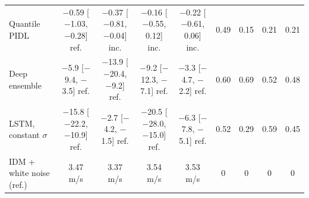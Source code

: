 \begin{table}[t]
\begin{tabularx}{\textwidth}{lCCCCcccc}
Quantile PIDL & $-$0.59 [$-$1.03, $-$0.28] ref. & $-$0.37 [$-$0.81, $-$0.04] inc. & $-$0.16 [$-$0.55, 0.12] inc. & $-$0.22 [$-$0.61, 0.06] inc. & 0.49 & 0.15 & 0.21 & 0.21 \\
Deep ensemble & $-$5.9 [$-$9.4, $-$3.5] ref. & $-$13.9 [$-$20.4, $-$9.2] ref. & $-$9.2 [$-$12.3, $-$7.1] ref. & $-$3.3 [$-$4.7, $-$2.2] ref. & 0.60 & 0.69 & 0.52 & 0.48 \\
LSTM, constant $\sigma$ & $-$15.8 [$-$22.2, $-$10.9] ref. & $-$2.7 [$-$4.2, $-$1.5] ref. & $-$20.5 [$-$28.0, $-$15.0] ref. & $-$6.3 [$-$7.8, $-$5.1] ref. & 0.52 & 0.29 & 0.59 & 0.45 \\
IDM + white noise (ref.) & 3.47 m/s & 3.37 m/s & 3.54 m/s & 3.53 m/s & 0 & 0 & 0 & 0 \\
\bottomrule
\end{tabularx}

\end{table}
